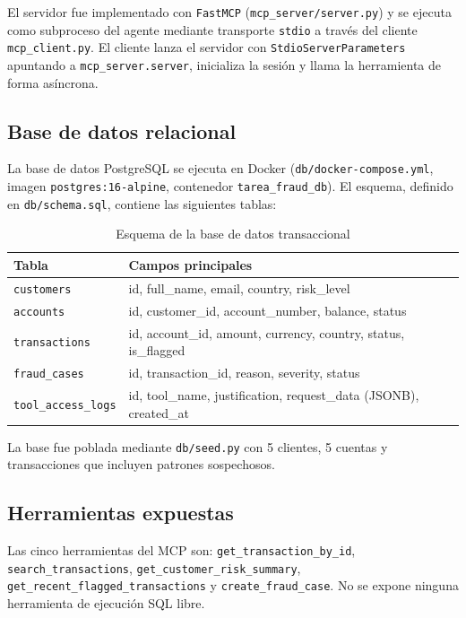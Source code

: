 \documentclass[conference]{IEEEtran}
\begin{document}
El servidor fue implementado con \texttt{FastMCP} (\texttt{mcp\_server/server.py}) y se ejecuta como subproceso del agente mediante transporte \texttt{stdio} a través del cliente \texttt{mcp\_client.py}. El cliente lanza el servidor con \texttt{StdioServerParameters} apuntando a \texttt{mcp\_server.server}, inicializa la sesión y llama la herramienta de forma asíncrona.

\subsection{Base de datos relacional}

La base de datos PostgreSQL se ejecuta en Docker (\texttt{db/docker-compose.yml}, imagen \texttt{postgres:16-alpine}, contenedor \texttt{tarea\_fraud\_db}). El esquema, definido en \texttt{db/schema.sql}, contiene las siguientes tablas:

\begin{table}[htbp]
\caption{Esquema de la base de datos transaccional}
\label{tab:schema}
\centering
\begin{tabular}{p{2.8cm}p{5cm}}
\toprule
\textbf{Tabla} & \textbf{Campos principales} \\
\midrule
\texttt{customers}          & id, full\_name, email, country, risk\_level \\
\texttt{accounts}           & id, customer\_id, account\_number, balance, status \\
\texttt{transactions}       & id, account\_id, amount, currency, country, status, is\_flagged \\
\texttt{fraud\_cases}       & id, transaction\_id, reason, severity, status \\
\texttt{tool\_access\_logs} & id, tool\_name, justification, request\_data (JSONB), created\_at \\
\bottomrule
\end{tabular}
\end{table}

La base fue poblada mediante \texttt{db/seed.py} con 5 clientes, 5 cuentas y transacciones que incluyen patrones sospechosos.

\subsection{Herramientas expuestas}

Las cinco herramientas del MCP son: \texttt{get\_transaction\_by\_id}, \texttt{search\_transactions}, \texttt{get\_customer\_risk\_summary}, \texttt{get\_recent\_flagged\_transactions} y \texttt{create\_fraud\_case}. No se expone ninguna herramienta de ejecución SQL libre.
\end{document}
